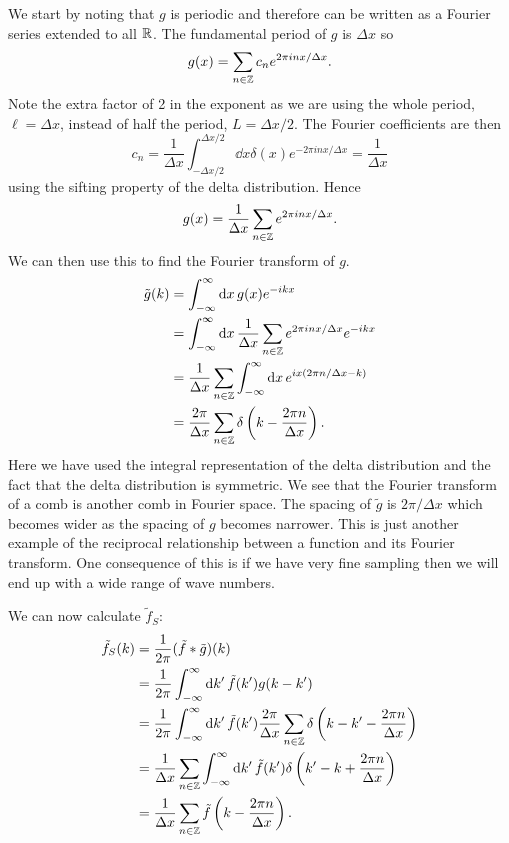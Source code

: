 \documentclass[a4paper]{article}
\newcommand{\convolution}{\mathbin{*}}
\begin{document}
    We start by noting that \(g\) is periodic and therefore can be written as a Fourier series extended to all \(\mathbb{R}\).
    The fundamental period of \(g\) is \(\Delta x\) so
    \[g(x) = \sum_{n\in\mathbb{Z}} c_ne^{2\pi inx/\Delta x}.\]
    Note the extra factor of 2 in the exponent as we are using the whole period, \(\ell = \Delta x\), instead of half the period, \(L = \Delta x / 2\).
    The Fourier coefficients are then
    \[c_n = \frac{1}{\Delta x}\int_{-\Delta x/2}^{\Delta x/2} \dd{x} \delta(x) e^{-2\pi inx/\Delta x} = \frac{1}{\Delta x}\]
    using the sifting property of the delta distribution.
    Hence
    \[g(x) = \frac{1}{\Delta x}\sum_{n\in\mathbb{Z}} e^{2\pi inx/\Delta x}.\]
    We can then use this to find the Fourier transform of \(g\).
    \begin{align*}
        \tilde{g}(k) &= \int_{-\infty}^{\infty} \dd{x} g(x)e^{-ikx}\\
        &= \int_{-\infty}^{\infty} \dd{x} \frac{1}{\Delta x} \sum_{n\in\mathbb{Z}} e^{2\pi inx/\Delta x}e^{-ikx}\\
        &= \frac{1}{\Delta x} \sum_{n\in\mathbb{Z}} \int_{-\infty}^{\infty} \dd{x} e^{ix(2\pi n/\Delta x - k)}\\
        &= \frac{2\pi}{\Delta x} \sum_{n\in\mathbb{Z}} \delta\left(k - \frac{2\pi n}{\Delta x}\right).
    \end{align*}
    Here we have used the integral representation of the delta distribution and the fact that the delta distribution is symmetric.
    We see that the Fourier transform of a comb is another comb in Fourier space.
    The spacing of \(\tilde{g}\) is \(2\pi/\Delta x\) which becomes wider as the spacing of \(g\) becomes narrower.
    This is just another example of the reciprocal relationship between a function and its Fourier transform.
    One consequence of this is if we have very fine sampling then we will end up with a wide range of wave numbers.
    
    We can now calculate \(\tilde{f}_S\):
    \begin{align*}
        \tilde{f}_S(k) &= \frac{1}{2\pi} (\tilde{f}\convolution\tilde{g})(k)\\
        &= \frac{1}{2\pi} \int_{-\infty}^{\infty} \dd{k'} \tilde{f}(k')g(k - k')\\
        &= \frac{1}{2\pi} \int_{-\infty}^{\infty} \dd{k'} \tilde{f}(k') \frac{2\pi}{\Delta x} \sum_{n\in\integers} \delta\left(k - k' - \frac{2\pi n}{\Delta x}\right)\\
        &= \frac{1}{\Delta x} \sum_{n\in\integers} \int_{-\infty}^{\infty} \dd{k'} \tilde{f}(k') \delta\left(k' - k + \frac{2\pi n}{\Delta x}\right)\\
        &= \frac{1}{\Delta x} \sum_{n\in\integers} \tilde{f}\left(k - \frac{2\pi n}{\Delta x}\right).
    \end{align*}
    
\end{document}
